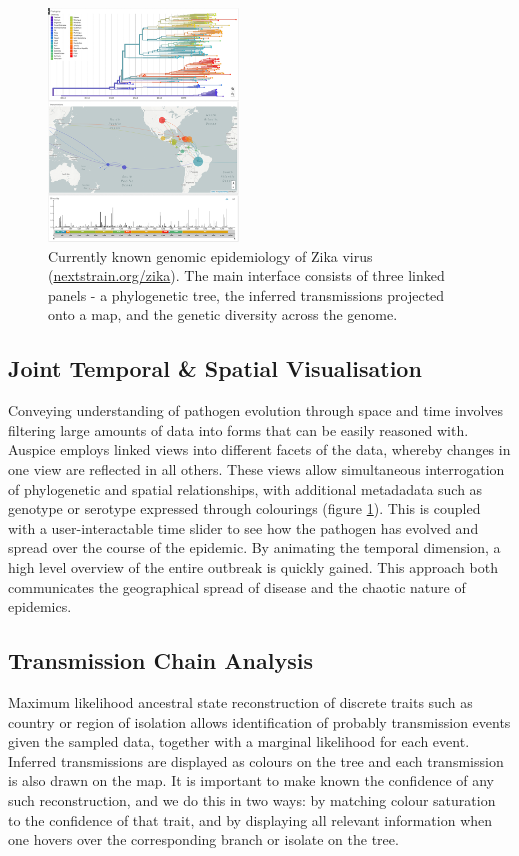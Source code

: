 \documentclass{bioinfo}
\begin{document}
\begin{figure}[!tpb]
\centerline{\includegraphics[width=0.45\textwidth]{figures/nextstrain}}
\caption{Currently known genomic epidemiology of Zika virus (\href{nextstrain.org/zika}{nextstrain.org/zika}). The main interface consists of three linked panels - a phylogenetic tree, the inferred transmissions projected onto a map, and the genetic diversity across the genome.}
\label{nextstrain}
\end{figure}

\subsection*{Joint Temporal \& Spatial Visualisation}
Conveying understanding of pathogen evolution through space and time involves filtering large amounts of data into forms that can be easily reasoned with.
Auspice employs linked views into different facets of the data, whereby changes in one view are reflected in all others.
These views allow simultaneous interrogation of phylogenetic and spatial relationships, with additional metadadata such as genotype or serotype expressed through colourings (figure \ref{nextstrain}).
This is coupled with a user-interactable time slider to see how the pathogen has evolved and spread over the course of the epidemic.
By animating the temporal dimension, a high level overview of the entire outbreak is quickly gained.
This approach both communicates the geographical spread of disease and the chaotic nature of epidemics.


\subsection*{Transmission Chain Analysis}
Maximum likelihood ancestral state reconstruction of discrete traits such as country or region of isolation allows identification of probably transmission events given the sampled data, together with a marginal likelihood for each event.
Inferred transmissions are displayed as colours on the tree and each transmission is also drawn on the map.
It is important to make known the confidence of any such reconstruction, and we do this in two ways: by matching colour saturation to the confidence of that trait, and by displaying all relevant information when one hovers over the corresponding branch or isolate on the tree. 
\end{document}
